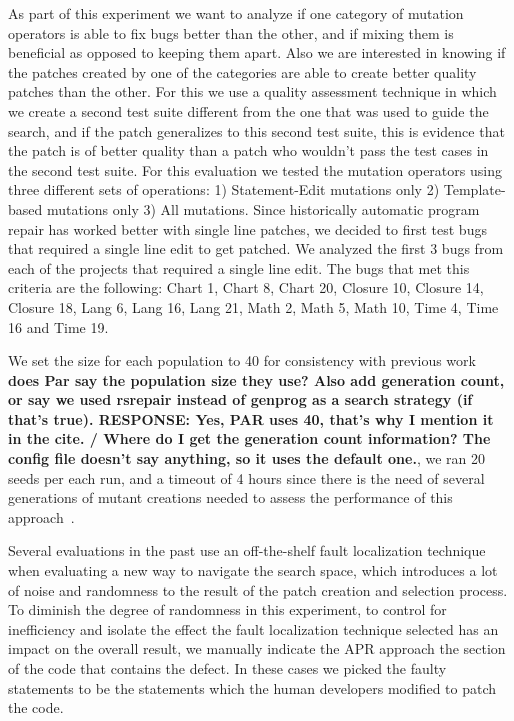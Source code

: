 \documentclass[conference]{IEEEtran}
\newcommand{\todo}[1]
  {{\scriptsize \textbf{\color{red} {#1}}}}
\begin{document}
  As part of this experiment we want to analyze if one category of mutation 
  operators is able to fix bugs better than the other, and if 
  mixing them is beneficial as opposed to keeping them apart. Also we are interested in 
knowing if the patches created by one of the categories are able to create better quality
patches than the other. For this we use a quality assessment technique in which we create a
second test suite different from the one that was used to guide the search, and if the patch
generalizes to this second test suite, this is evidence that the patch is of better quality than
a patch who wouldn't pass the test cases in the second test suite.  For this evaluation
we tested the mutation operators using three different sets 
of operations: 1) Statement-Edit mutations only 2) Template-based mutations 
only 3) All mutations.  
Since historically automatic program repair has worked better with single line 
patches, we decided to first test bugs that required a single line edit to get 
patched. We analyzed the first 3 bugs from each of the projects that required a 
single line edit. The bugs that met this criteria are the following: Chart 1, 
Chart 8, Chart 20, Closure 10, Closure 14, Closure 18, Lang 6, Lang 16, Lang 21, 
Math 2, Math 5, Math 10, Time 4, Time 16 and Time 19.

We set the size for each population to 40 for consistency with 
previous work~\cite{legoues12,kim2013}\todo{does Par say the population size
  they use? Also add generation count, or say we used rsrepair instead of
  genprog as a search strategy (if that's true).  RESPONSE: Yes, PAR uses 40, that's why I mention it in the cite. / Where do I get the generation count information? The config file doesn't say anything, so it uses the default one.}, we ran 20 seeds per each run, and a timeout of 4 hours since there is 
the need of several generations of mutant creations needed to assess the 
performance of this approach~\cite{arcuri11}.



Several evaluations in the past use an off-the-shelf fault localization
technique when evaluating a new way to navigate the search space, which
introduces a lot of noise and randomness to the result of the patch creation and
selection process. To diminish the degree of randomness in this experiment, to
  control for inefficiency and isolate the effect the fault localization technique selected has an impact on the overall result, we manually
 indicate the APR approach the section of the code that contains
the defect. In these cases we picked the faulty statements to be the statements
which the human developers modified to patch the code. 
\end{document}
